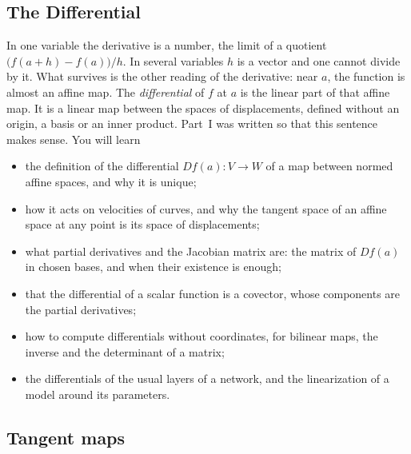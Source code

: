 \begin{notechapter}
\chapter{The Differential}
\label{ch:differential}

\begin{chapterintro}
In one variable the derivative is a number, the limit of a quotient
$\bigl(f(a + h) - f(a)\bigr)/h$. In several variables $h$ is a vector and
one cannot divide by it. What survives is the other reading of the
derivative: near $a$, the function is almost an affine map. The
\emph{differential} of $f$ at $a$ is the linear part of that affine map.
It is a linear map between the spaces of displacements, defined without
an origin, a basis or an inner product. Part~I was written so that this
sentence makes sense. You will learn
\begin{itemize}[nosep]
  \item the definition of the differential $Df(a):V\to W$ of a map
        between normed affine spaces, and why it is unique;
  \item how it acts on velocities of curves, and why the tangent space of
        an affine space at any point is its space of displacements;
  \item what partial derivatives and the Jacobian matrix are: the matrix
        of $Df(a)$ in chosen bases, and when their existence is enough;
  \item that the differential of a scalar function is a covector, whose
        components are the partial derivatives;
  \item how to compute differentials without coordinates, for bilinear
        maps, the inverse and the determinant of a matrix;
  \item the differentials of the usual layers of a network, and the
        linearization of a model around its parameters.
\end{itemize}
\end{chapterintro}

\section{Tangent maps}\label{differential:sec:tangent}


\end{notechapter}
